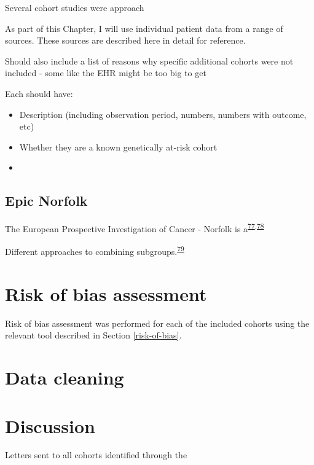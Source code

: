 \documentclass[a4paper, twoside]{templates/ociamthesis}
\providecommand{\tightlist}{%
  \setlength{\itemsep}{0pt}\setlength{\parskip}{0pt}}
\begin{document}
Several cohort studies were approach

As part of this Chapter, I will use individual patient data from a range of sources. These sources are described here in detail for reference.

Should also include a list of reasons why specific additional cohorts were not included - some like the EHR might be too big to get

Each should have:

\begin{itemize}
\tightlist
\item
  Description (including observation period, numbers, numbers with outcome, etc)
\item
  Whether they are a known genetically at-risk cohort
\item
\end{itemize}

\hypertarget{epic-norfolk}{%
\subsection{Epic Norfolk}\label{epic-norfolk}}

The European Prospective Investigation of Cancer - Norfolk is a\textsuperscript{\protect\hyperlink{ref-riboli1997}{77},\protect\hyperlink{ref-riboli2002}{78}}

Different approaches to combining subgroups.\textsuperscript{\protect\hyperlink{ref-fisher2017}{79}}

\hypertarget{risk-of-bias-assessment}{%
\section{Risk of bias assessment}\label{risk-of-bias-assessment}}

Risk of bias assessment was performed for each of the included cohorts using the relevant tool described in Section \ref{risk-of-bias}.

\hypertarget{data-cleaning}{%
\section{Data cleaning}\label{data-cleaning}}

\hypertarget{discussion-3}{%
\section{Discussion}\label{discussion-3}}

Letters sent to all cohorts identified through the
\end{document}

